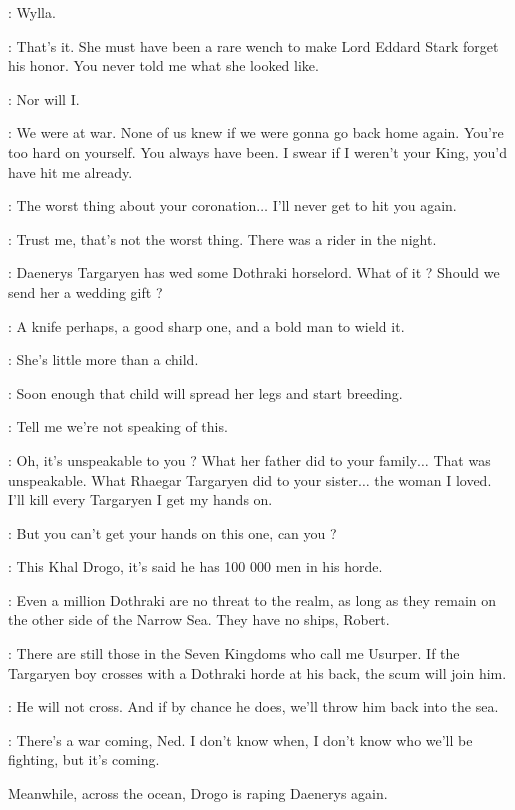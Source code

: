 \NED: Wylla. 

\ROBERT: That's it. She must have been a rare wench to make Lord Eddard Stark forget his honor. You never told me what she looked like. 

\NED: Nor will I. 

\ROBERT: We were at war. None of us knew if we were gonna go back home again. You're too hard on yourself. You always have been. I swear if I weren't your King, you'd have hit me already. 

\NED: The worst thing about your coronation$\ldots$ I'll never get to hit you again. 

\ROBERT: Trust me, that's not the worst thing. There was a rider in the night. 

\NED: Daenerys Targaryen has wed some Dothraki horselord. What of it ? Should we send her a wedding gift ? 

\ROBERT: A knife perhaps, a good sharp one, and a bold man to wield it. 

\NED: She's little more than a child. 

\ROBERT: Soon enough that child will spread her legs and start breeding. 

\NED: Tell me we're not speaking of this. 

\ROBERT: Oh, it's unspeakable to you ? What her father did to your family$\ldots$ That was unspeakable. What Rhaegar Targaryen did to your sister$\ldots$ the woman I loved. I'll kill every Targaryen I get my hands on. 

\NED: But you can't get your hands on this one, can you ? 

\ROBERT: This Khal Drogo, it's said he has 100 000 men in his horde. 

\NED: Even a million Dothraki are no threat to the realm, as long as they remain on the other side of the Narrow Sea. They have no ships, Robert. 

\ROBERT: There are still those in the Seven Kingdoms who call me Usurper. If the Targaryen boy crosses with a Dothraki horde at his back, the scum will join him. 

\NED: He will not cross. And if by chance he does, we'll throw him back into the sea. 

\ROBERT: There's a war coming, Ned. I don't know when, I don't know who we'll be fighting, but it's coming. 

\scene

\n Meanwhile, across the ocean, Drogo is raping Daenerys again.

